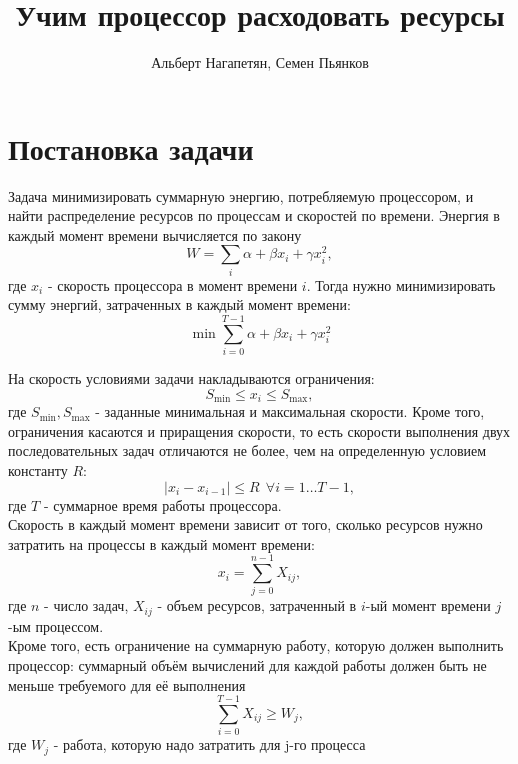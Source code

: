 \documentclass{article}
\title{Учим процессор расходовать ресурсы}
\author{Альберт Нагапетян, Семен Пьянков}
\date{}
\begin{document}
\maketitle

\section{Постановка задачи}

Задача минимизировать суммарную энергию, потребляемую процессором, и найти распределение ресурсов по процессам и скоростей по времени. 
Энергия в каждый момент времени вычисляется по закону $$W = \sum\limits_{i} \alpha + \beta x_i + \gamma x_i^2,$$ где $x_i$ - скорость процессора в момент времени $i$. Тогда нужно минимизировать сумму энергий, затраченных в каждый момент времени: $$\min \sum \limits_{i=0}^{T-1} \alpha + \beta x_i + \gamma x_i^2$$

На скорость условиями задачи накладываются ограничения: $$S_{\min} \le x_i \le S_{\max},$$ где $S_{\min}, S_{\max}$ - заданные минимальная и максимальная скорости. Кроме того, ограничения касаются и приращения скорости, то есть скорости выполнения двух последовательных задач отличаются не более, чем на определенную условием константу $R$: $$|x_i-x_{i-1}| \le R ~~ \forall i = 1 \dots T-1,$$ где $T$ - суммарное время работы процессора. \\

Скорость в каждый момент времени зависит от того, сколько ресурсов нужно затратить на процессы в каждый момент времени:
$$x_i = \sum \limits_{j=0}^{n-1} X_{ij},$$ где $n$ - число задач, $X_{ij}$ - объем ресурсов, затраченный в $i$-ый момент времени $j$-ым процессом.\\

Кроме того, есть ограничение на суммарную работу, которую должен выполнить процессор: суммарный объём вычислений для каждой работы должен быть не меньше требуемого для её выполнения\\
$$\sum \limits_{i=0}^{T-1} X_{ij} \ge W_j,$$ где $W_j$ - работа, которую надо затратить для j-го процесса\\

\end{document}
